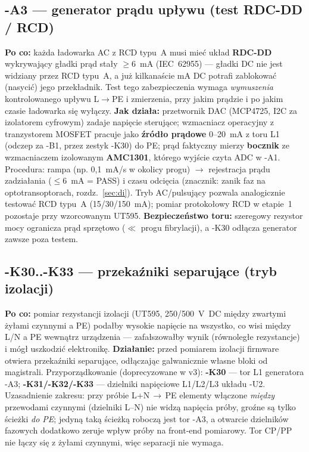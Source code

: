 \documentclass[11pt,a4paper]{article}
\begin{document}
\subsection{-A3 --- generator prądu upływu (test RDC-DD / RCD)}
\label{sec:a3}
\textbf{Po co:} każda ładowarka AC z RCD typu~A musi mieć układ \textbf{RDC-DD} wykrywający
gładki prąd stały $\ge$6~mA (IEC~62955) --- gładki DC nie jest widziany przez RCD typu~A, a już
kilkanaście mA DC potrafi zablokować (nasycić) jego przekładnik. Test tego zabezpieczenia wymaga
\emph{wymuszenia} kontrolowanego upływu L$\to$PE i zmierzenia, przy jakim prądzie i po jakim
czasie ładowarka się wyłączy. \textbf{Jak działa:} przetwornik DAC (MCP4725, I2C za izolatorem
cyfrowym) zadaje napięcie sterujące; wzmacniacz operacyjny z tranzystorem MOSFET pracuje jako
\textbf{źródło prądowe} 0--20~mA z toru L1 (odczep za -B1, przez zestyk -K30) do PE; prąd
faktyczny mierzy \textbf{bocznik} ze wzmacniaczem izolowanym \textbf{AMC1301}, którego wyjście
czyta ADC w -A1. Procedura: rampa (np. 0,1~mA/s w okolicy progu) $\to$ rejestracja prądu
zadziałania ($\le$6~mA = PASS) i czasu odcięcia (znacznik: zanik faz na optotransoptorach,
rozdz.~\ref{sec:di}). Tryb AC/pulsujący pozwala analogicznie testować RCD typu~A (15/30/150~mA);
pomiar protokołowy RCD w etapie~1 pozostaje przy wzorcowanym UT595. \textbf{Bezpieczeństwo toru:}
szeregowy rezystor mocy ogranicza prąd sprzętowo ($\ll$ progu fibrylacji), a -K30 odłącza
generator zawsze poza testem.

\subsection{-K30..-K33 --- przekaźniki separujące (tryb izolacji)}
\label{sec:k30}
\textbf{Po co:} pomiar rezystancji izolacji (UT595, 250/500~V~DC między zwartymi żyłami czynnymi
a PE) podałby wysokie napięcie na wszystko, co wisi między L/N a PE wewnątrz urządzenia ---
zafałszowałby wynik (równoległe rezystancje) i mógł uszkodzić elektronikę. \textbf{Działanie:}
przed pomiarem izolacji firmware otwiera przekaźniki separujące, odłączając galwanicznie własne
bloki od magistrali. Przyporządkowanie (doprecyzowane w v3): \textbf{-K30} --- tor L1 generatora
-A3; \textbf{-K31/-K32/-K33} --- dzielniki napięciowe L1/L2/L3 układu -U2. Uzasadnienie zakresu:
przy próbie L+N$\,\to\,$PE elementy włączone \emph{między} przewodami czynnymi (dzielniki L--N)
nie widzą napięcia próby, groźne są tylko ścieżki \emph{do PE}; jedyną taką ścieżką roboczą jest
tor -A3, a otwarcie dzielników fazowych dodatkowo zeruje wpływ próby na front-end pomiarowy.
Tor CP/PP nie łączy się z żyłami czynnymi, więc separacji nie wymaga.
\end{document}
